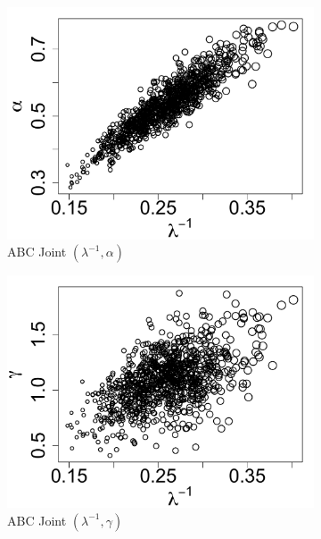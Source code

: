 \documentclass[12pt]{article}
\begin{document}
\begin{figure}[htbp]
   \centering
\begin{subfigure}{0.32\textwidth}
\centering
\includegraphics[width = \textwidth]{figures/bate_joint_k_alpha.pdf} 
\caption{ABC Joint $(\lambda^{-1}, \alpha)$}\label{subfig:joint_alpha_k_bate}
\end{subfigure}
\begin{subfigure}{0.32\textwidth}
\centering
\includegraphics[width = \textwidth]{figures/bate_joint_k_gamma.pdf} 
\caption{ABC Joint $(\lambda^{-1}, \gamma)$}\label{subfig:joint_gamma_k_bate}
\end{subfigure}
\begin{subfigure}{0.32\textwidth}

\end{subfigure}
\end{figure}
\end{document}
